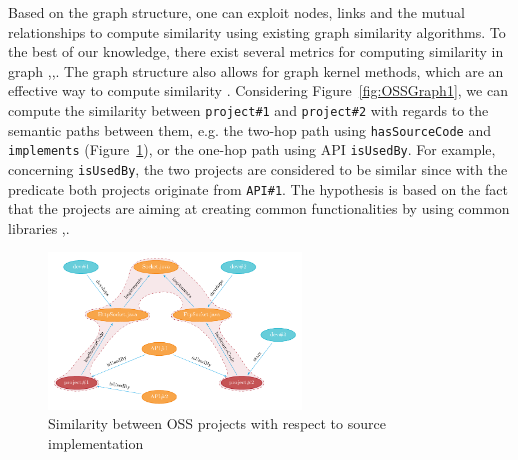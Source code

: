Based on the graph structure, one can exploit nodes, links and the mutual relationships to compute similarity using existing graph similarity algorithms. To the best of our knowledge, there exist several metrics for computing similarity in graph \cite{Blondel:2004:MSG:1035533.1035557},\cite{Nguyen:2015:CRV:2942298.2942305},\cite{Nguyen:2015:ESP:2740908.2742141}. The graph structure also allows for graph kernel methods, which are an effective way to compute similarity \cite{ODMD14a}. Considering Figure~\ref{fig:OSSGraph1}, we can compute the similarity between \texttt{project\#1} and \texttt{project\#2} with regards to the semantic paths between them, e.g. the two-hop path using \texttt{hasSourceCode} and \texttt{implements} (Figure~\ref{fig:OSSGraph2}), or the one-hop path using API \texttt{isUsedBy}. For example, concerning \texttt{isUsedBy}, the two projects are considered to be similar since with the predicate both projects originate from \texttt{API\#1}. The hypothesis is based on the fact that the projects are aiming at creating common functionalities by using common libraries \cite{McMillan:2012:DSS:2337223.2337267},\cite{6671293}.


\begin{figure}[h!]
	\centering
	\includegraphics[width=0.60\textwidth]{images/OSSGraph2.pdf}
	\caption{Similarity between OSS projects with respect to source implementation}
	\label{fig:OSSGraph2}
\end{figure}


